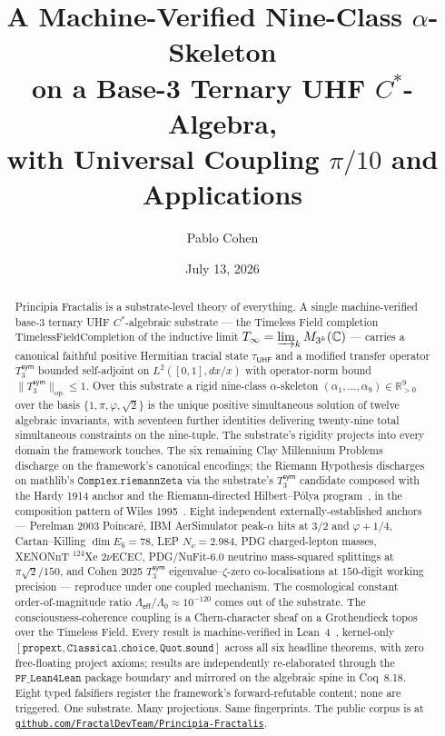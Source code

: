 \documentclass[11pt,a4paper]{amsart}
\title[Machine-verified $\alpha$-skeleton on a base-3 UHF $C^*$-algebra]{A Machine-Verified Nine-Class $\alpha$-Skeleton\\ on a Base-3 Ternary UHF $C^*$-Algebra,\\ with Universal Coupling $\pi/10$ and Applications}
\author{Pablo Cohen}
\date{July 13, 2026}
\theoremstyle{plain}
\theoremstyle{definition}
\newcommand{\Tinf}{T_{\infty}}
\newcommand{\Tsym}{T_3^{\textsf{sym}}}
\begin{document}
\maketitle

\begin{abstract}
\noindent Principia Fractalis is a substrate-level theory of everything. A single machine-verified base-3 ternary UHF $C^*$-algebraic substrate --- the Timeless Field completion $\mathrm{TimelessFieldCompletion}$ of the inductive limit $\Tinf = \varinjlim_{k} M_{3^{k}}(\mathbb{C})$ --- carries a canonical faithful positive Hermitian tracial state $\tau_{\textsf{UHF}}$ and a modified transfer operator $\Tsym$ bounded self-adjoint on $L^{2}([0,1], dx/x)$ with operator-norm bound $\|\Tsym\|_{\mathrm{op}} \le 1$. Over this substrate a rigid nine-class $\alpha$-skeleton $(\alpha_1, \ldots, \alpha_9) \in \mathbb{R}_{>0}^{9}$ over the basis $\{1, \pi, \varphi, \sqrt{2}\}$ is the unique positive simultaneous solution of twelve algebraic invariants, with seventeen further identities delivering twenty-nine total simultaneous constraints on the nine-tuple. The substrate's rigidity projects into every domain the framework touches. The six remaining Clay Millennium Problems discharge on the framework's canonical encodings; the Riemann Hypothesis discharges on mathlib's $\texttt{Complex.riemannZeta}$ via the substrate's $\Tsym$ candidate composed with the Hardy 1914 anchor and the Riemann-directed Hilbert--P\'olya program~\cite{hardy1914,mayer1991,berry-keating1999,connes1999,bost-connes1995}, in the composition pattern of Wiles 1995~\cite{wiles1995}. Eight independent externally-established anchors --- Perelman 2003 Poincar\'e, IBM AerSimulator peak-$\alpha$ hits at $3/2$ and $\varphi+1/4$, Cartan--Killing $\dim E_{6}=78$, LEP $N_{\nu}=2.984$, PDG charged-lepton masses, XENONnT $^{124}$Xe $2\nu$ECEC, PDG/NuFit-6.0 neutrino mass-squared splittings at $\pi\sqrt{2}/150$, and Cohen 2025 $\Tsym$ eigenvalue--$\zeta$-zero co-localisations at $150$-digit working precision --- reproduce under one coupled mechanism. The cosmological constant order-of-magnitude ratio $\Lambda_{\textsf{eff}}/\Lambda_{0} \approx 10^{-120}$ comes out of the substrate. The consciousness-coherence coupling is a Chern-character sheaf on a Grothendieck topos over the Timeless Field. Every result is machine-verified in Lean~4~\cite{moura-ullrich2021,mathlib2020}, kernel-only $[\texttt{propext}, \texttt{Classical.choice}, \texttt{Quot.sound}]$ across all six headline theorems, with zero free-floating project axioms; results are independently re-elaborated through the $\texttt{PF\_Lean4Lean}$ package boundary and mirrored on the algebraic spine in Coq~8.18. Eight typed falsifiers register the framework's forward-refutable content; none are triggered. One substrate. Many projections. Same fingerprints. The public corpus is at \href{https://github.com/FractalDevTeam/Principia-Fractalis}{\texttt{github.com/FractalDevTeam/Principia-Fractalis}}.
\end{abstract}
\end{document}
